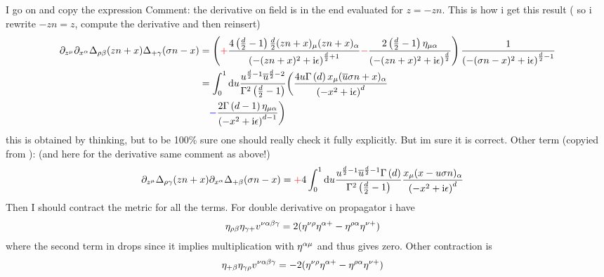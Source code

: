 I go on and copy the expression  Comment: the derivative on field is in the end evaluated for $z=-zn$. This is how i get this result ( so i rewrite $-zn = z$, compute the derivative and then reinsert)
\begin{align}
\partial_{z^\mu} \partial_{x^\alpha} \Delta_{\rho \beta}(zn+x) \Delta_{+ \gamma}(\sigma n -x)
&=
\left({\color{red}+}\frac{4 \left(\frac{d}{2}-1\right)\frac{d}{2}(zn+x)_\mu (zn+x)_\alpha}{\left(-(zn+x)^2 +\text{i} \epsilon\right)^{\frac{d}{2}+1}} {\color{red}-} \frac{2\left( \frac{d}{2}-1\right) \eta_{\mu \alpha} }{\left(-(zn+x)^2 +\text{i} \epsilon\right)^{\frac{d}{2}}}\right)\frac{1}{\left(-(\sigma n-x)^2 + \text{i} \epsilon\right)^{\frac{d}{2}-1}}
\\
&=
\int_{0}^{1} \text{d} u \frac{ u^{\frac{d}{2}-1} \overline u^{\frac{d}{2}-2} }{\Gamma^2\left( \frac{d}{2} -1 \right)}	\bigg(\frac{4 u \Gamma\left( d \right) x_\mu (\overline u\sigma n+x)_\alpha}{\left(-x^2 +\text{i} \epsilon\right)^{d}} 
\\&~~~
{\color{blue}-} \frac{2\Gamma\left( d-1 \right) \eta_{\mu \alpha} }{\left(-x^2+\text{i} \epsilon\right)^{d-1}}\bigg)
\label{randomstep3}
\end{align} 
this is obtained by thinking, but to be 100\% sure one should really check it fully explicitly. But im sure it is correct.
Other term (copyied from ): (and here for the derivative same comment as above!)
\begin{align}
\partial_{z^\mu}  \Delta_{\rho \gamma}(zn+x) \partial_{x^\alpha}\Delta_{+ \beta}(\sigma n -x)
&=
{\color{red}+}4\int_{0}^{1} \text{d} u \frac{u^{\frac{d}{2}-1} \overline u^{\frac{d}{2}-1}\Gamma\left( d \right)}{\Gamma^2\left( \frac{d}{2}-1 \right)}\frac{x_\mu(x -  u\sigma n)_\alpha}{\left(-x^2 + \text{i} \epsilon\right)^{d}}
\end{align}
Then I should contract the metric for all the terms. 
For double derivative on propagator i have
\begin{align}
	\eta_{\rho \beta} \eta_{\gamma + } v^{\nu \alpha\beta\gamma} &= 2(\eta^{\nu \rho } \eta^{\alpha + } - \eta^{\rho \alpha}\eta^{\nu +})
\end{align}
where the second term in  drops since it implies multiplication with $\eta^{\alpha \mu}$ and thus gives zero.
Other contraction is
\begin{align}
	\eta_{+ \beta} \eta_{\gamma \rho } v^{\nu \alpha\beta\gamma} &= -2(\eta^{\nu \rho } \eta^{\alpha + } - \eta^{\rho \alpha}\eta^{\nu +})
\end{align}
